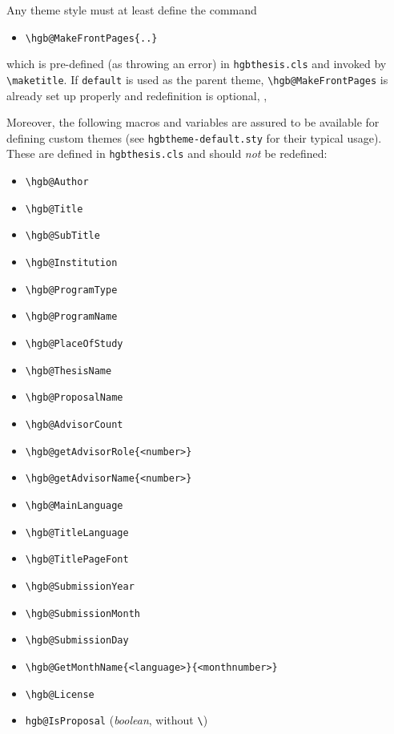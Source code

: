 \documentclass[language=english]{hgbarticle}
\begin{document}
Any theme style must at least define the command
\begin{itemize}
  \item[] \verb!\hgb@MakeFrontPages{..}!
\end{itemize}
which is pre-defined (as throwing an error) in \texttt{hgbthesis.cls}
and invoked by \verb!\maketitle!.
If \texttt{default} is used as the parent theme, \verb!\hgb@MakeFrontPages! 
is already set up properly and redefinition is optional, \ie,
%
\begin{LaTeXCode}[numbers=none]
\renewcommand{\hgb@MakeFrontPages}{..}	%
\end{LaTeXCode}
%

\noindent
Moreover, the following macros and variables are assured to be available for defining custom themes
(see \texttt{hgbtheme-default.sty} for their typical usage).
These are defined in \texttt{hgbthesis.cls} and should \emph{not} be redefined:
%
\begin{itemize}
  \item[] \verb!\hgb@Author!
  \item[] \verb!\hgb@Title!
  \item[] \verb!\hgb@SubTitle!
  \item[] \verb!\hgb@Institution!
  \item[] \verb!\hgb@ProgramType!
  \item[] \verb!\hgb@ProgramName!
  \item[] \verb!\hgb@PlaceOfStudy!
\medskip
	\item[] \verb!\hgb@ThesisName!
	\item[] \verb!\hgb@ProposalName!
\medskip
  \item[] \verb!\hgb@AdvisorCount!
  \item[] \verb!\hgb@getAdvisorRole{<number>}!
  \item[] \verb!\hgb@getAdvisorName{<number>}!
\medskip
  \item[] \verb!\hgb@MainLanguage!
  \item[] \verb!\hgb@TitleLanguage!
  \item[] \verb!\hgb@TitlePageFont!
\medskip 
  \item[] \verb!\hgb@SubmissionYear!
  \item[] \verb!\hgb@SubmissionMonth!
  \item[] \verb!\hgb@SubmissionDay!
  \item[] \verb!\hgb@GetMonthName{<language>}{<monthnumber>}!
\medskip
	\item[] \verb!\hgb@License!
\medskip
  \item[] \verb!hgb@IsProposal! (\emph{boolean}, without \verb!\!)
\end{itemize}
\end{document}
